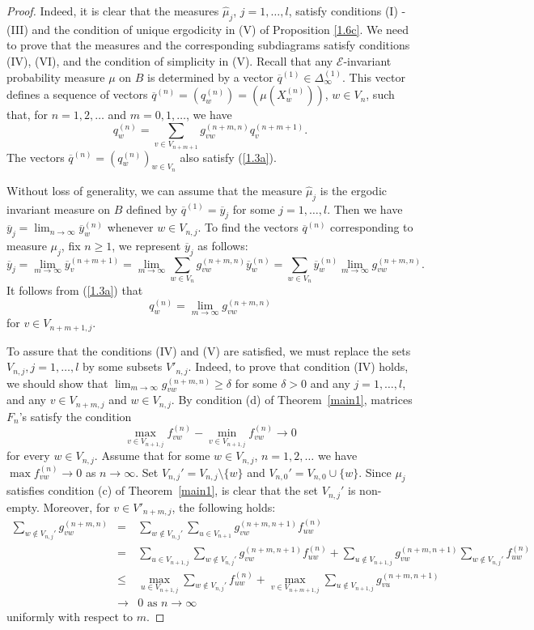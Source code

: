 \documentclass[11pt, english, reqno]{amsart}
\theoremstyle{definition}
\theoremstyle{remark}
\theoremstyle{plain}
\def\ov{\overline}
\def\wh{\widehat}
\numberwithin{equation}{section}
\begin{document}
{\begin{proof}
Indeed, it is clear that the measures $\wh {\mu}_j$, $j = 1,\ldots,l$, 
satisfy conditions (I) - 
(III) and the condition of unique ergodicity in (V) of Proposition \ref{1.6c}. 
We need to prove that the measures and the corresponding subdiagrams 
satisfy conditions (IV), (VI), and the condition of simplicity in (V). 
 Recall that any $ \mathcal{E}$-invariant probability measure $\mu$ on $B$
  is determined by a vector $\ov q^{(1)}  \in 
  \Delta_\infty^{(1)}$. This vector
 defines a sequence of vectors $\ov q^{(n)} = (q_w^{(n)}) =
 (\mu(X_w^{(n)}))$, $w \in V_n$, such that, for $n = 1,2,\ldots$ and $m =
 0, 1, \ldots$, we have
$$
q_w^{(n)} = \sum_{v \in V_{n+m+1}}g_{vw}^{(n+m,n)}q_v^{(n+m+1)}.
$$
The vectors $\ov q^{(n)} = (q_w^{(n)})_{w \in V_n}$ also satisfy
 (\ref{1.3a}).

Without loss of generality, we can assume that the measure $\wh {\mu}_j$
is the ergodic invariant measure on $B$ defined by $\ov q^{(1)} = \ov y_j$ for some
$j = 1, \ldots, l$. Then we have $\ov y_j = \lim_{n \rightarrow \infty}\ov
y_w^{(n)}$ whenever $w \in V_{n,j}$. To find the vectors $\ov q^{(n)}$
corresponding to measure $\mu_j$, fix $n \geq 1$, we represent $\ov y_j$
as follows:
$$
\ov y_j = \lim_{m \rightarrow \infty} \ov y_v^{(n+m+1)} = \lim_{m
\rightarrow \infty} \sum_{w \in V_n}g_{vw}^{(n+m,n)}\ov y_w^{(n)} =
\sum_{w \in V_n} \ov y_w^{(n)} \lim_{m \rightarrow \infty} g_{vw}^{(n
+m,n)}.
$$
It follows from (\ref{1.3a}) that
$$
q_w^{(n)} = \lim_{m \rightarrow \infty} g_{vw}^{(n+m,n)}
$$
for $v \in V_{n+m+1,j}$.

To assure that the conditions (IV) and (V) are satisfied, we must
replace the sets $V_{n,j}, j = 1, \ldots, l$ by some subsets $V'_{n,j}$. 
Indeed, to prove that condition (IV) holds, we should show
that $\lim _{m \rightarrow \infty} g_{vw}^{(n+m,n)} \geq \delta$ for some
$\delta > 0$ and any $j = 1,\ldots,l$, and any $v \in V_{n+m,j}$  and 
$w \in V_{n,j}$. By condition (d) of Theorem~\ref{main1}, matrices $F_n$'s satisfy the condition
$$
\max_{v \in V_{n+1,j}}f_{vw}^{(n)} - \min_{v \in V_{n+1,j}}f_{vw}^{(n)}
\rightarrow 0
$$
for every $w \in V_{n,j}$.
Assume that for some $w \in V_{n,j}$, $n = 1,2,\ldots$ we have $\max
f_{vw}^{(n)} \rightarrow 0$ as $n \rightarrow \infty$. Set $V_{n,j}' =
V_{n,j} \setminus \{w\}$ and $V_{n,0}' = V_{n,0} \cup \{w\}$. Since $
\mu_j$ satisfies condition (c) of Theorem~\ref{main1}, is clear that the set
$V_{n,j}'$ is non-empty. Moreover, for $v \in V'_{n+m,j}$, the following
holds:
\begin{eqnarray*}
\sum_{w \notin V_{n,j}'}g_{vw}^{(n+m,n)} &=& \sum_{w \notin V_{n,j}'}
\sum_{u \in V_{n+1}} g_{vw}^{(n+m,n+1)} f_{uw}^{(n)}\\
&=& \sum_{u \in V_{n+1,j}} \sum_{w \notin V_{n,j}'} g_{vw}^{(n+m,n+1)}
f_{uw}^{(n)} + \sum_{u \notin V_{n+1,j}} g_{vw}^{(n+m,n+1)} \sum_{w
\notin V_{n,j}'} f_{uw}^{(n)}\\
&\leq& \max_{u \in V_{n+1,j}}\sum_{w \notin V_{n,j}'} f_{uw}^{(n)} +
\max_{v \in V_{n+m+1,j}}\sum_{u \notin V_{n+1,j}} g_{vu}^{(n+m,n+1)}\\
&\rightarrow& 0 \mbox{ as } n \rightarrow \infty
\end{eqnarray*}
uniformly with respect to $m$.


\end{proof}}
\end{document}
